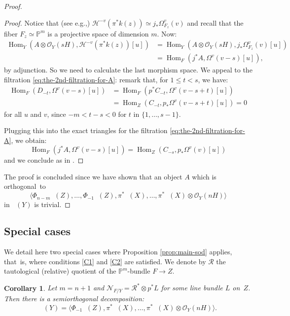 \documentclass[11pt]{article}
\newcommand{\eg}{e.g.,\xspace}
\let\mathcal\mathscr
\theoremstyle{plain}
\newtheorem{cor}[theorem]{Corollary}
\theoremstyle{definition}
\newcommand{\cat}[1]{\mathsf{#1}}
\newcommand{\sod}[1]{\langle #1 \rangle}
\DeclareMathOperator{\Db}{{\cat{D}^{\mathrm{b}}}}
\DeclareMathOperator{\Hom}{Hom}
\newcommand{\PP}{\mathbb{P}}
\newcommand{\sheaf}[1]{\mathcal{#1}}
\newcommand{\kh}{\sheaf{H}}
\newcommand{\kn}{\sheaf{N}}
\newcommand{\ko}{\sheaf{O}}\let\OO\ko\let\cO\ko
\newcommand{\kr}{\sheaf{R}}
\begin{document}
\begin{proof}
\begin{proof}
Notice that (see \eg \cite[Prop.\,11.12]{Huybook}) $\kh^{-v}( \pi^* k(z)) \simeq j_*\Omega_{F_z}^v(v)$ and recall that the fiber
$F_z \simeq \PP^m$ is a projective space of dimension $m$. Now:\vspace*{-3pt}
\begin{align*}
\Hom_Y(A \otimes \ko_Y(sH),\kh^{-v}( \pi^* k(z))[u]) & = \Hom_Y(A \otimes \ko_Y(sH),j_*\Omega_{F_z}^v(v)[u])\\
& = \Hom_F(j^* A, \Omega^v(v-s)[u]),
\end{align*}
by adjunction. So we need to calculate the last morphism space. We appeal to the filtration \eqref{eq:the-2nd-filtration-for-A}:
remark that, for $1 \leq t < s$, we have:\vspace*{-3pt}
\begin{align*}
\Hom_F(D_{-t}, \Omega^v(v-s)[u]) & = \Hom_F(p^* C_{-t}, \Omega^v(v-s+t)[u]) \\
& = \Hom_Z(C_{-t}, p_*\Omega^v(v-s+t)[u])=0
\end{align*}
for all $u$ and $v$, since $-m < t-s < 0$ for $t$ in $\{1,\ldots,s-1\}$.

Plugging this into the exact triangles for the filtration \eqref{eq:the-2nd-filtration-for-A}, we obtain:\vspace*{-3pt}
\[
\Hom_F(j^* A, \Omega^v(v-s)[u])= \Hom_Z(C_{-s},p_*\Omega^v(v)[u])
\]
and we conclude as in \cite[Prop.\,11.18]{Huybook}.
\end{proof}

The proof is concluded since we have shown that an object $A$ which is orthogonal~to\vspace*{-3pt}
\[
\sod{\Phi_{n-m}\Db(Z),\ldots,\Phi_{-1}\Db(Z),\pi^*\Db(X),\ldots,\pi^*\Db(X)\otimes \ko_Y(nH)}
\]
in $\Db(Y)$ is trivial.
\end{proof}

\subsection*{Special cases}

We detail here two special cases where Proposition \ref{prop:main-sod} applies, that~is,
where conditions \eqref{C1} and \eqref{C2} are satisfied. We denote by $\kr$ the tautological (relative)
quotient of the $\PP^m$-bundle $F \to Z$.

\begin{cor}\label{cor:ourcases}
Let $m=n+1$ and $\kn_{F/Y}=\kr^* \otimes p^* L$ for some line bundle $L$ on~$Z$. Then there is a
semiorthogonal decomposition:
\[
\Db(Y)=\sod{\Phi_{-1}\Db(Z),\pi^*\Db(X),\ldots,\pi^*\Db(X)\otimes \ko_Y(nH)}.
\]
\end{cor}
\end{document}
